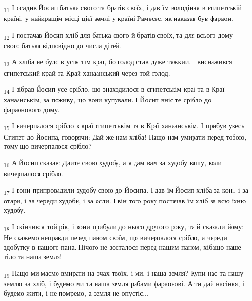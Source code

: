 \begin{tcolorbox}
\textsubscript{11} І осадив Йосип батька свого та братів своїх, і дав їм володіння в єгипетській країні, у найкращім місці цієї землі у країні Рамесес, як наказав був фараон.
\end{tcolorbox}
\begin{tcolorbox}
\textsubscript{12} І постачав Йосип хліб для батька свого й братів своїх, та для всього дому свого батька відповідно до числа дітей.
\end{tcolorbox}
\begin{tcolorbox}
\textsubscript{13} А хліба не було в усім тім краї, бо голод став дуже тяжкий. І виснажився єгипетський край та Край ханаанський через той голод.
\end{tcolorbox}
\begin{tcolorbox}
\textsubscript{14} І зібрав Йосип усе срібло, що знаходилося в єгипетськім краї та в Краї ханаанськім, за поживу, що вони купували. І Йосип вніс те срібло до фараонового дому.
\end{tcolorbox}
\begin{tcolorbox}
\textsubscript{15} І вичерпалося срібло в краї єгипетськім та в Краї ханаанськім. І прибув увесь Єгипет до Йосипа, говорячи: Дай же нам хліба! Нащо нам умирати перед тобою, тому що вичерпалося срібло?
\end{tcolorbox}
\begin{tcolorbox}
\textsubscript{16} А Йосип сказав: Дайте свою худобу, а я дам вам за худобу вашу, коли вичерпалося срібло.
\end{tcolorbox}
\begin{tcolorbox}
\textsubscript{17} І вони припровадили худобу свою до Йосипа. І дав їм Йосип хліба за коні, і за отари, і за череди худоби, і за осли. І він того року постачав їм хліб за всю їхню худобу.
\end{tcolorbox}
\begin{tcolorbox}
\textsubscript{18} І скінчився той рік, і вони прибули до нього другого року, та й сказали йому: Не скажемо неправди перед паном своїм, що вичерпалося срібло, а череди здобутку в нашого пана. Нічого не зосталося перед нашим паном, хібащо наше тіло та наша земля!
\end{tcolorbox}
\begin{tcolorbox}
\textsubscript{19} Нащо ми маємо вмирати на очах твоїх, і ми, і наша земля? Купи нас та нашу землю за хліб, і будемо ми та наша земля рабами фараонові. А ти дай насіння, і будемо жити, і не помремо, а земля не опустіє...
\end{tcolorbox}
